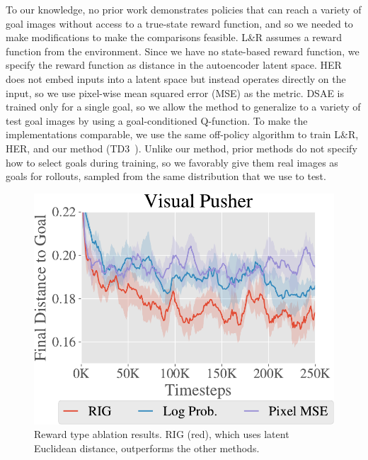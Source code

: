 \documentclass{article}
\begin{document}
To our knowledge, no prior work demonstrates policies that can reach a variety of goal images without access to a true-state reward function, and so we needed to make modifications to make the comparisons feasible.
L\&R assumes a reward function from the environment.
Since we have no state-based reward function, we specify the reward function as distance in the autoencoder latent space.
HER does not embed inputs into a latent space but instead operates directly on the input, so we use pixel-wise mean squared error (MSE) as the metric.
DSAE is trained only for a single goal, so we allow the method to generalize to a variety of test goal images by using a goal-conditioned Q-function.
To make the implementations comparable, we use the same off-policy algorithm to train L\&R, HER, and our method (TD3~\citep{fujimoto2018td3}).
Unlike our method, prior methods do not specify how to select goals during training, so we favorably give them real images as goals for rollouts, sampled from the same distribution that we use to test.

\begin{figure}
    \centering
    \vspace{-0.2in}
    \includegraphics[width=\linewidth]{img/pusher_reward_type_ablation_main.pdf}
    \vspace{-0.2in}
    \caption{Reward type ablation results. RIG (red), which uses latent Euclidean distance, outperforms the other methods.}
    \vspace{-0.1in}
    \label{fig:reward-ablation}
\end{figure}
\end{document}
